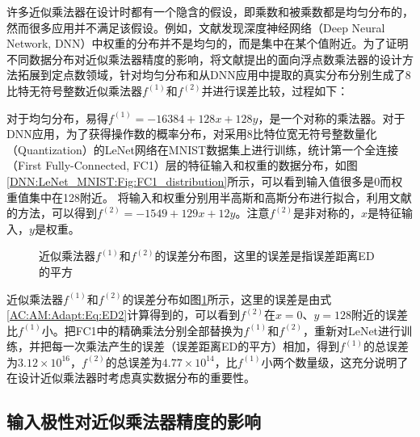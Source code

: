 许多近似乘法器在设计时都有一个隐含的假设，即乘数和被乘数都是均匀分布的，然而很多应用并不满足该假设。例如，文献\cite{DNN:WeightAnalysis2}发现深度神经网络（Deep Neural Network, DNN）中权重的分布并不是均匀的，而是集中在某个值附近。为了证明不同数据分布对近似乘法器精度的影响，将文献\cite{AC:AM:OU}提出的面向浮点数乘法器的设计方法拓展到定点数领域，针对均匀分布和从DNN应用中提取的真实分布分别生成了8比特无符号整数近似乘法器$f^{(1)}$和$f^{(2)}$并进行误差比较，过程如下：

对于均匀分布，易得$f^{(1)} = -16384 + 128 x + 128 y$，是一个对称的乘法器。对于DNN应用，为了获得操作数的概率分布，对采用8比特位宽无符号整数量化（Quantization）的LeNet网络在MNIST数据集上进行训练\cite{DNN:LeNet_MNIST}，统计第一个全连接（First Fully-Connected, FC1）层的特征输入和权重的数据分布，如图\ref{DNN:LeNet_MNIST:Fig:FC1_distribution}所示，可以看到输入值很多是0而权重值集中在128附近。
将输入和权重分别用半高斯和高斯分布进行拟合，利用文献\cite{AC:AM:OU}的方法，可以得到$f^{(2)} = -1549 + 129 x + 12 y$。注意$f^{(2)}$是非对称的，$x$是特征输入，$y$是权重。

\begin{figure}[!htb]
    \centering
    \centering
    \caption{近似乘法器$f^{(1)}$和$f^{(2)}$的误差分布图，这里的误差是指误差距离ED的平方}
\label{AC:AM:Adapt:Fig:f1_f2_ED2_dists}
\end{figure}

近似乘法器$f^{(1)}$和$f^{(2)}$的误差分布如图\ref{AC:AM:Adapt:Fig:f1_f2_ED2_dists}所示，这里的误差是由式\eqref{AC:AM:Adapt:Eq:ED2}计算得到的，可以看到$f^{(2)}$在$x=0$、$y=128$附近的误差比$f^{(1)}$小。把FC1中的精确乘法分别全部替换为$f^{(1)}$和$f^{(2)}$，重新对LeNet进行训练，并把每一次乘法产生的误差（误差距离ED的平方）相加，得到$f^{(1)}$的总误差为$3.12 \times 10^{16}$，$f^{(2)}$的总误差为$4.77 \times 10^{14}$，比$f^{(1)}$小两个数量级，这充分说明了在设计近似乘法器时考虑真实数据分布的重要性。

\subsection{输入极性对近似乘法器精度的影响}

